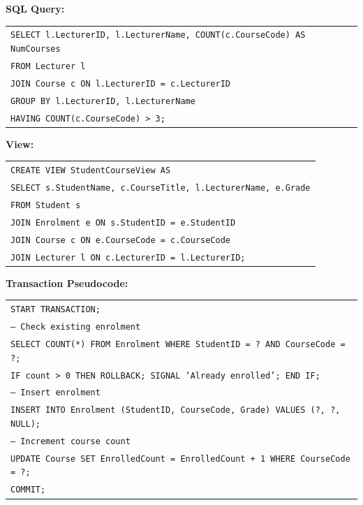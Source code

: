 \documentclass[11pt]{article}
\begin{document}
\begin{corrige}[Exercise 3]
\textbf{SQL Query:}
\begin{center}
\begin{tabular}{|l|}
\hline
\texttt{SELECT l.LecturerID, l.LecturerName, COUNT(c.CourseCode) AS NumCourses} \\
\texttt{FROM Lecturer l} \\
\texttt{JOIN Course c ON l.LecturerID = c.LecturerID} \\
\texttt{GROUP BY l.LecturerID, l.LecturerName} \\
\texttt{HAVING COUNT(c.CourseCode) > 3;} \\
\hline
\end{tabular}
\end{center}
\end{corrige}

\begin{corrige}[Exercise 4]
\textbf{View:}
\begin{center}
\begin{tabular}{|l|}
\hline
\texttt{CREATE VIEW StudentCourseView AS} \\
\texttt{SELECT s.StudentName, c.CourseTitle, l.LecturerName, e.Grade} \\
\texttt{FROM Student s} \\
\texttt{JOIN Enrolment e ON s.StudentID = e.StudentID} \\
\texttt{JOIN Course c ON e.CourseCode = c.CourseCode} \\
\texttt{JOIN Lecturer l ON c.LecturerID = l.LecturerID;} \\
\hline
\end{tabular}
\end{center}
\end{corrige}

\begin{corrige}[Exercise 5]
\textbf{Transaction Pseudocode:}
\begin{center}
\begin{tabular}{|l|}
\hline
\texttt{START TRANSACTION;} \\
\texttt{-- Check existing enrolment} \\
\texttt{SELECT COUNT(*) FROM Enrolment WHERE StudentID = ? AND CourseCode = ?;} \\
\texttt{IF count > 0 THEN ROLLBACK; SIGNAL 'Already enrolled'; END IF;} \\
\texttt{-- Insert enrolment} \\
\texttt{INSERT INTO Enrolment (StudentID, CourseCode, Grade) VALUES (?, ?, NULL);} \\
\texttt{-- Increment course count} \\
\texttt{UPDATE Course SET EnrolledCount = EnrolledCount + 1 WHERE CourseCode = ?;} \\
\texttt{COMMIT;} \\
\hline
\end{tabular}
\end{center}
\end{corrige}
\end{document}
